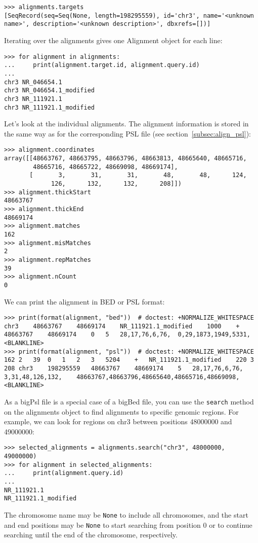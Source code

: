 \begin{verbatim}
>>> alignments.targets
[SeqRecord(seq=Seq(None, length=198295559), id='chr3', name='<unknown name>', description='<unknown description>', dbxrefs=[])]
\end{verbatim}
Iterating over the alignments gives one Alignment object for each line: 
\begin{verbatim}
>>> for alignment in alignments:
...     print(alignment.target.id, alignment.query.id)
...
chr3 NR_046654.1
chr3 NR_046654.1_modified
chr3 NR_111921.1
chr3 NR_111921.1_modified
\end{verbatim}
Let's look at the individual alignments. The alignment information is stored in the same way as for the corresponding PSL file (see section~\ref{subsec:align_psl}):
\begin{verbatim}
>>> alignment.coordinates
array([[48663767, 48663795, 48663796, 48663813, 48665640, 48665716,
        48665716, 48665722, 48669098, 48669174],
       [       3,       31,       31,       48,       48,      124,
             126,      132,      132,      208]])
>>> alignment.thickStart
48663767
>>> alignment.thickEnd
48669174
>>> alignment.matches
162
>>> alignment.misMatches
2
>>> alignment.repMatches
39
>>> alignment.nCount
0
\end{verbatim}
We can print the alignment in BED or PSL format:
\begin{verbatim}
>>> print(format(alignment, "bed"))  # doctest: +NORMALIZE_WHITESPACE
chr3	48663767	48669174	NR_111921.1_modified	1000	+	48663767	48669174	0	5	28,17,76,6,76,	0,29,1873,1949,5331,
<BLANKLINE>
>>> print(format(alignment, "psl"))  # doctest: +NORMALIZE_WHITESPACE
162	2	39	0	1	2	3	5204	+	NR_111921.1_modified	220	3	208	chr3	198295559	48663767	48669174	5	28,17,76,6,76,	3,31,48,126,132,	48663767,48663796,48665640,48665716,48669098,
<BLANKLINE>
\end{verbatim}

As a bigPsl file is a special case of a bigBed file, you can use the \verb|search| method on the alignments object to find alignments to specific genomic regions. For example, we can look for regions on chr3 between positions 48000000 and 49000000:
\begin{verbatim}
>>> selected_alignments = alignments.search("chr3", 48000000, 49000000)
>>> for alignment in selected_alignments:
...     print(alignment.query.id)
...
NR_111921.1
NR_111921.1_modified
\end{verbatim}
The chromosome name may be \verb|None| to include all chromosomes, and the start and end positions may be \verb|None| to start searching from position 0 or to continue searching until the end of the chromosome, respectively.

